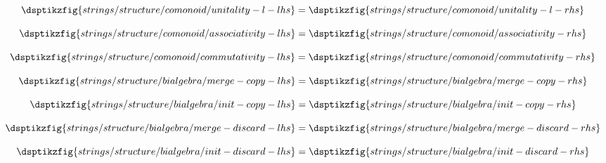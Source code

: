 \begin{frame}
    \begin{minipage}{0.21\textwidth}
        \begin{equation*}
            \dsptikzfig{strings/structure/comonoid/unitality-l-lhs}
            =
            \dsptikzfig{strings/structure/comonoid/unitality-l-rhs}
        \end{equation*}
    \end{minipage}
    \quad
    \begin{minipage}{0.26\textwidth}
        \begin{equation*}
            \dsptikzfig{strings/structure/comonoid/associativity-lhs}
            =
            \dsptikzfig{strings/structure/comonoid/associativity-rhs}
        \end{equation*}
    \end{minipage}
    \quad
    \begin{minipage}{0.26\textwidth}
        \begin{equation*}
            \dsptikzfig{strings/structure/comonoid/commutativity-lhs}
            =
            \dsptikzfig{strings/structure/comonoid/commutativity-rhs}
        \end{equation*}
    \end{minipage}

    \begin{minipage}{0.28\textwidth}
        \begin{equation*}
            \dsptikzfig{strings/structure/bialgebra/merge-copy-lhs}
            =
            \dsptikzfig{strings/structure/bialgebra/merge-copy-rhs}
        \end{equation*}
    \end{minipage}
    \begin{minipage}{0.23\textwidth}
        \begin{equation*}
            \dsptikzfig{strings/structure/bialgebra/init-copy-lhs}
            =
            \dsptikzfig{strings/structure/bialgebra/init-copy-rhs}
        \end{equation*}
    \end{minipage}
    \begin{minipage}{0.23\textwidth}
        \begin{equation*}
            \dsptikzfig{strings/structure/bialgebra/merge-discard-lhs}
            =
            \dsptikzfig{strings/structure/bialgebra/merge-discard-rhs}
        \end{equation*}
    \end{minipage}
    \begin{minipage}{0.2\textwidth}
        \begin{equation*}
            \dsptikzfig{strings/structure/bialgebra/init-discard-lhs}
            =
            \dsptikzfig{strings/structure/bialgebra/init-discard-rhs}
        \end{equation*}
    \end{minipage}
\end{frame}